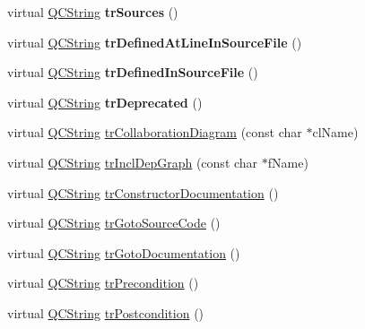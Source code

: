 \begin{DoxyCompactItemize}
\item 
\mbox{\label{class_translator_norwegian_aff117baf6e8cbd1c6fadfe69baa3e1c1}} 
virtual \mbox{\hyperlink{class_q_c_string}{Q\+C\+String}} {\bfseries tr\+Sources} ()
\item 
\mbox{\label{class_translator_norwegian_ac0f0e9c46cd36a15dfe3748e5d590a45}} 
virtual \mbox{\hyperlink{class_q_c_string}{Q\+C\+String}} {\bfseries tr\+Defined\+At\+Line\+In\+Source\+File} ()
\item 
\mbox{\label{class_translator_norwegian_a54f951546cac0efff958fe6b16457e49}} 
virtual \mbox{\hyperlink{class_q_c_string}{Q\+C\+String}} {\bfseries tr\+Defined\+In\+Source\+File} ()
\item 
\mbox{\label{class_translator_norwegian_af4da33e3e08ea884e7e25e69c09d1a0d}} 
virtual \mbox{\hyperlink{class_q_c_string}{Q\+C\+String}} {\bfseries tr\+Deprecated} ()
\item 
virtual \mbox{\hyperlink{class_q_c_string}{Q\+C\+String}} \mbox{\hyperlink{class_translator_norwegian_ac40494d5e82232929951ef28b9c20aa5}{tr\+Collaboration\+Diagram}} (const char $\ast$cl\+Name)
\item 
virtual \mbox{\hyperlink{class_q_c_string}{Q\+C\+String}} \mbox{\hyperlink{class_translator_norwegian_a879742954ba446b8d26b7d2eced9b02a}{tr\+Incl\+Dep\+Graph}} (const char $\ast$f\+Name)
\item 
virtual \mbox{\hyperlink{class_q_c_string}{Q\+C\+String}} \mbox{\hyperlink{class_translator_norwegian_a69a708b9c415de38064383a2f190b305}{tr\+Constructor\+Documentation}} ()
\item 
virtual \mbox{\hyperlink{class_q_c_string}{Q\+C\+String}} \mbox{\hyperlink{class_translator_norwegian_aa58b3c26f941088fa8c5d1d8d1f90d01}{tr\+Goto\+Source\+Code}} ()
\item 
virtual \mbox{\hyperlink{class_q_c_string}{Q\+C\+String}} \mbox{\hyperlink{class_translator_norwegian_a0dc5533adfc9908456985c664115e6a7}{tr\+Goto\+Documentation}} ()
\item 
virtual \mbox{\hyperlink{class_q_c_string}{Q\+C\+String}} \mbox{\hyperlink{class_translator_norwegian_af5d99cff63e361a35082769d6333ee64}{tr\+Precondition}} ()
\item 
virtual \mbox{\hyperlink{class_q_c_string}{Q\+C\+String}} \mbox{\hyperlink{class_translator_norwegian_ac21330f4db8f249fc193e9d0363e6089}{tr\+Postcondition}} ()

\end{DoxyCompactItemize}
